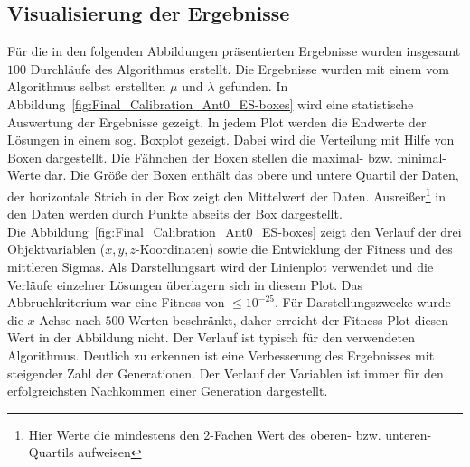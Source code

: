 \subsection{Visualisierung der Ergebnisse}
Für die in den folgenden Abbildungen präsentierten Ergebnisse wurden insgesamt $100$ Durchläufe des Algorithmus erstellt. Die Ergebnisse wurden mit einem vom Algorithmus selbst erstellten $\mu$ und $\lambda$ gefunden. In Abbildung~\ref{fig:Final_Calibration_Ant0_ES-boxes} wird eine statistische Auswertung der Ergebnisse gezeigt. In jedem Plot werden die Endwerte der Lösungen in einem sog. Boxplot gezeigt. Dabei wird die Verteilung mit Hilfe von Boxen dargestellt. Die Fähnchen der Boxen stellen die maximal- bzw. minimal-Werte dar. Die Größe der Boxen enthält das obere und untere Quartil der Daten, der horizontale Strich in der Box zeigt den Mittelwert der Daten. Ausreißer\footnote{Hier Werte die mindestens den $2$-Fachen Wert des oberen- bzw. unteren-Quartils aufweisen} in den Daten werden durch Punkte abseits der Box dargestellt.\\
%

Die Abbildung~\ref{fig:Final_Calibration_Ant0_ES-boxes} zeigt den Verlauf der drei Objektvariablen ($x,y,z$-Koordinaten) sowie die Entwicklung der Fitness und des mittleren Sigmas. Als Darstellungsart wird der Linienplot verwendet und die Verläufe einzelner Lösungen überlagern sich in diesem Plot. Das Abbruchkriterium war eine Fitness von $\leq 10^{-25}$.%
Für Darstellungszwecke wurde die $x$-Achse nach $500$ Werten beschränkt, daher erreicht der Fitness-Plot diesen Wert in der Abbildung nicht. Der Verlauf ist typisch für den verwendeten Algorithmus. Deutlich zu erkennen ist eine Verbesserung des Ergebnisses mit steigender Zahl der Generationen. Der Verlauf der Variablen ist immer für den erfolgreichsten Nachkommen einer Generation dargestellt.\\
%

